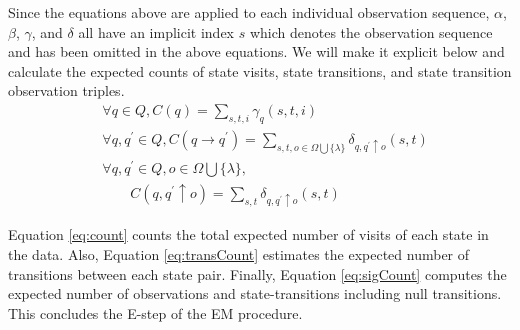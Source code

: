 \documentclass[letterpaper]{article}
\begin{document}
Since the equations above are applied to each individual observation sequence, $\alpha$, $\beta$, $\gamma$, and $\delta$ all have an implicit index $s$ which denotes the observation sequence and has been omitted in the above equations. We will make it explicit below and calculate the expected counts of state visits, state transitions, and state transition observation triples.
{\footnotesize
\begin{align}
&\forall q \in Q, C(q) = \sum_{s,t,i} \gamma_q(s,t,i) \label{eq:count}\\
&\forall q, q^\prime \in Q, C(q \rightarrow q^\prime) = \sum_{s,t,o \in \Omega \bigcup \{\lambda\}} \delta_{q,q^\prime \uparrow o}(s,t) \label{eq:transCount}\\
&\forall q, q^\prime \in Q, o \in \Omega \bigcup \{\lambda\}, \label{eq:sigCount}\\
&\qquad C(q, q^\prime \uparrow o) = \sum_{s,t} \delta_{q,q^\prime \uparrow o}(s,t) \nonumber
\end{align}
}%



Equation \ref{eq:count} counts the total expected number of visits of each state in the data. Also, Equation \ref{eq:transCount} estimates the expected number of transitions between each state pair. Finally, Equation \ref{eq:sigCount} computes the expected number of observations and state-transitions including null transitions. This concludes the E-step of the EM procedure.

\end{document}

